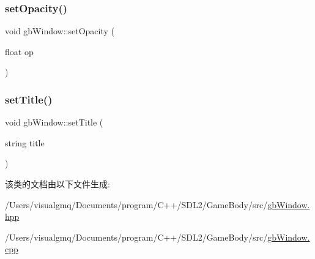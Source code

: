 \mbox{\label{classgb_window_a4a89c22270c639142295477ab37e838f}} 
\subsubsection{\texorpdfstring{setOpacity()}{setOpacity()}}
{\footnotesize\ttfamily void gb\+Window\+::set\+Opacity (\begin{DoxyParamCaption}\item[{float}]{op }\end{DoxyParamCaption})}

\mbox{\label{classgb_window_ab7a05f81b0191dbccafc897287d1b759}} 
\subsubsection{\texorpdfstring{setTitle()}{setTitle()}}
{\footnotesize\ttfamily void gb\+Window\+::set\+Title (\begin{DoxyParamCaption}\item[{string}]{title }\end{DoxyParamCaption})}



该类的文档由以下文件生成\+:\begin{DoxyCompactItemize}
\item 
/\+Users/visualgmq/\+Documents/program/\+C++/\+S\+D\+L2/\+Game\+Body/src/\mbox{\hyperlink{gb_window_8hpp}{gb\+Window.\+hpp}}\item 
/\+Users/visualgmq/\+Documents/program/\+C++/\+S\+D\+L2/\+Game\+Body/src/\mbox{\hyperlink{gb_window_8cpp}{gb\+Window.\+cpp}}\end{DoxyCompactItemize}
